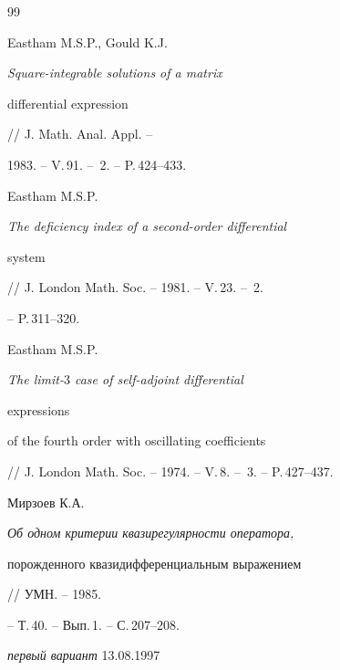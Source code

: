 \begin{thebibliography}{99}


Eastham M.S.P., Gould K.J. {\em Square-integrable solutions of a matrix 


differential expression} // J. Math. Anal. Appl. -- 


1983. -- V.\,91. -- \No\,2. -- P.\,424--433. 




Eastham M.S.P. {\em The deficiency index of a second-order differential 


system} // J. London Math. Soc. -- 1981. -- V.\,23. -- \No\,2. 


-- P.\,311--320. 




Eastham M.S.P. {\em The limit-$3$ case of self-adjoint differential 


expressions 


of the fourth order with oscillating coefficients} 


// J. London Math. Soc. -- 1974. -- V.\,8. -- \No\,3. -- P.\,427--437. 




Мирзоев К.А. {\em Об одном критерии квазирегулярности оператора, 


порожденного квазидифференциальным выражением} // УМН. -- 1985. 


-- Т.\,40. -- Вып.\,1. -- С.\,207--208. 


 


\end{thebibliography} 


 


\vskip 2cm 


 




% 


{{\it первый вариант} 13.08.1997} 




\label{end} 


 


